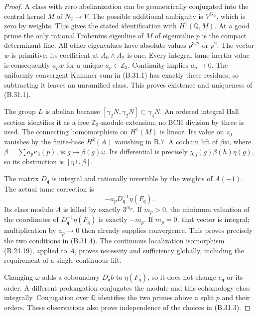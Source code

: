 \begin{proof}
A class with zero abelianization can be geometrically
conjugated into the central kernel $M$ of $N_2\to V$.
The possible additional ambiguity is $V^{G_{\mathbb Q}}$,
which is zero by weights. This gives the stated
identification with $H^1(\mathbb Q,M)$.
At a good prime the only rational Frobenius eigenline of
$M$ of eigenvalue $p$ is the compact determinant line.
All other eigenvalues have absolute values $p^{3/2}$ or
$p^2$. The vector $w$ is primitive: its coefficient at
$A_0\wedge A_2$ is one. Every integral tame inertia value
is consequently $a_pw$ for a unique $a_p\in\mathbb Z_3$.
Continuity implies $a_p\to0$.
The uniformly convergent Kummer sum in (B.31.1) has exactly
these residues, so subtracting it leaves an unramified class.
This proves existence and uniqueness of (B.31.1).

The group $L$ is abelian because
$[\gamma_2N,\gamma_2N]\subset\gamma_4N$.
An ordered integral Hall section identifies it as a free
$\mathbb Z_3$-module extension; no BCH division by three
is used. The connecting homomorphism on $H^1(M)$ is
linear. Its value on $z_0$ vanishes by the finite-base
$H^2(A)$ vanishing in B.7. A cochain lift of
$\beta w$, where $\beta=\sum a_p\kappa_3(p)$, is
$g\mapsto\beta(g)\omega$. Its differential is precisely
$\chi_3(g)\beta(h)\eta(g)$, so its obstruction is
$[\eta\cup\beta]$.

The matrix $D_{\mathfrak q}$ is integral and rationally
invertible by the weights of $A(-1)$.
The actual tame correction is
\[
             -a_pD_{\mathfrak q}^{-1}\eta(F_{\mathfrak q}).
                                                               \tag{B.31.5}
\]
Its class modulo $A$ is killed by exactly $3^{m_p}$.
If $m_p>0$, the minimum valuation of the coordinates of
$D_{\mathfrak q}^{-1}\eta(F_{\mathfrak q})$ is exactly
$-m_p$. If $m_p=0$, that vector is integral; multiplication
by $a_p\to0$ then already supplies convergence.
This proves precisely the two conditions in (B.31.4).
The continuous localization isomorphism (B.24.19), applied
to $A$, proves necessity and sufficiency globally, including
the requirement of a single continuous lift.

Changing $\omega$ adds a coboundary $D_{\mathfrak q}b$
to $\eta(F_{\mathfrak q})$, so it does not change
$e_{\mathfrak q}$ or its order. A different prolongation
conjugates the module and this cohomology class integrally.
Conjugation over $\mathbb Q$ identifies the two primes
above a split $p$ and their orders. These observations
also prove independence of the choices in (B.31.3).


\end{proof}
